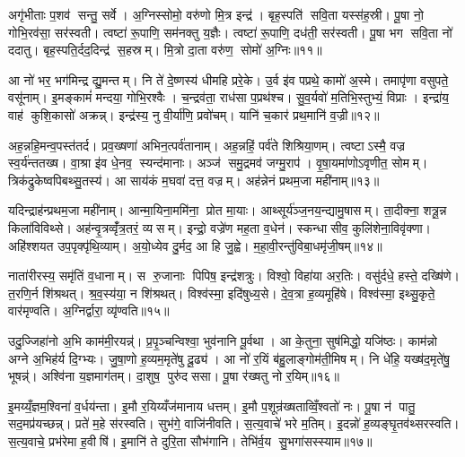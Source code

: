 अगृ॑भीताः प॒शव॑ सन्तु॒ सर्वे। अ॒ग्निस्सोमो॒ वरु॑णो मि॒त्र इन्द्र॑। बृह॒स्पति॑ सवि॒ता यस्स॑ह॒स्री। पू॒षा नो॒ गोभि॒रव॑सा॒ सर॑स्वती। त्वष्टा॑ रू॒पाणि॒ सम॑नक्तु य॒ज्ञैः। त्वष्टा॑ रू॒पाणि॒ दध॑ती॒ सर॑स्वती। पू॒षा भग सवि॒ता नो॑ ददातु। बृह॒स्पति॒र्दद॒दिन्द्र॑ स॒हस्रम्। मि॒त्रो दा॒ता वरु॑ण॒ सोमो॑ अ॒ग्निः॥११॥\anuvakamend[क॒र॒न्निवि॑ष्टमस्यता॒न्नव॑ च]

आ नो॑ भर॒ भग॑मिन्द्र द्यु॒मन्तम्। नि ते॑ दे॒ष्णस्य॑ धीमहि प्ररे॒के। उ॒र्व इ॑व पप्रथे॒ कामो॑ अ॒स्मे। तमापृ॑णा वसुपते॒ वसू॑नाम्। इ॒मङ्कामं॑ मन्दया॒ गोभि॒रश्वैः। च॒न्द्रव॑ता॒ राध॑सा प॒प्रथ॑श्च। सु॒व॒र्यवो॑ म॒तिभि॒स्तुभ्यं॒ विप्राः। इन्द्रा॑य॒ वाह॑ कुशि॒कासो॑ अक्रन्न्। इन्द्र॑स्य॒ नु वी॒र्या॑णि॒ प्रवो॑चम्। यानि॑ च॒कार॑ प्रथ॒मानि॑ व॒ज्री॥१२॥

अह॒न्नहि॒मन्व॒पस्त॑तर्द। प्रव॒ख्षणा॑ अभिन॒त्पर्व॑तानाम्। अह॒न्नहिं॒ पर्व॑ते शिश्रिया॒णम्। त्वष्टाऽस्मै॒ वज्र स्व॒र्य॑न्ततख्ष। वा॒श्रा इ॑व धे॒नव॒ स्यन्द॑मानाः। अञ्ज॑ समु॒द्रमव॑ जग्मु॒राप॑। वृ॒षा॒यमा॑णोऽवृणीत॒ सोमम्। त्रिक॑द्रुकेष्वपिबथ्सु॒तस्य॑। आ साय॑कं म॒घवा॑ दत्त॒ वज्रम्। अह॑न्नेनं प्रथम॒जा मही॑नाम्॥१३॥

यदिन्द्राह॑न्प्रथम॒जा मही॑नाम्। आन्मा॒यिना॒ममि॑ना॒ प्रोत मा॒याः। आथ्सूर्य॑ञ्ज॒नय॒न्द्यामु॒षासम्। ता॒दीक्ना॒ शत्रू॒न्न किला॑विविथ्से। अह॑न्वृ॒त्रव्वृँ॑त्र॒तरं॒ व्यसम्। इन्द्रो॒ वज्रे॑ण मह॒ता व॒धेन॑। स्कन्धासीव॒ कुलि॑शेना॒विवृ॑क्णा। अहि॑श्शयत उप॒पृक्पृ॑थि॒व्याम्। अ॒यो॒ध्येव दु॒र्मद॒ आ हि जु॒ह्वे। म॒हा॒वी॒रन्तु॑विबा॒धमृ॑जी॒षम्॥१४॥

नाता॑रीरस्य॒ समृ॑तिं व॒धानाम्। स रु॒जानाः पिपिष॒ इन्द्र॑शत्रुः। विश्वो॒ विहा॑या अर॒तिः। वसु॑र्दधे॒ हस्ते॒ दख्षि॑णे। त॒रणि॒र्न शि॑श्रथत्। श्र॒व॒स्य॑या॒ न शि॑श्रथत्। विश्व॑स्मा॒ इदि॑षुध्य॒से। दे॒व॒त्रा ह॒व्यमूहि॑षे। विश्व॑स्मा॒ इथ्सु॒कृते॒ वार॑मृण्वति। अ॒ग्निर्द्वारा॒ व्यृ॑ण्वति॥१५॥

उदु॒ज्जिहा॑नो अ॒भि काम॑मी॒रयन्न्॑। प्र॒पृ॒ञ्चन्विश्वा॒ भुव॑नानि पू॒र्वथा। आ के॒तुना॒ सुष॑मिद्धो॒ यजि॑ष्ठः। काम॑न्नो अग्ने अ॒भिह॑र्य दि॒ग्भ्यः। जु॒षा॒णो ह॒व्यम॒मृते॑षु दू॒ढ्य॑। आ नो॑ र॒यिं ब॑हु॒लाङ्गोम॑ती॒मिषम्। नि धे॑हि॒ यख्ष॑द॒मृते॑षु॒ भूषन्न्॑। अश्वि॑ना य॒ज्ञमाग॑तम्। दा॒शुष॒ पुरु॑दससा। पू॒षा र॑ख्षतु नो र॒यिम्॥१६॥

इ॒मय्यँ॒ज्ञम॒श्विना॑ व॒र्धय॑न्ता। इ॒मौ र॒यिय्यँज॑मानाय धत्तम्। इ॒मौ प॒शून्र॑ख्षताव्विँ॒श्वतो॑ नः। पू॒षा न॑ पातु॒ सद॒मप्र॑यच्छन्न्। प्रते॑ म॒हे स॑रस्वति। सुभ॑गे॒ वाजि॑नीवति। स॒त्य॒वाचे॑ भरे म॒तिम्। इ॒दन्नो॑ ह॒व्यङ्घृ॒तव॑थ्सरस्वति। स॒त्य॒वाचे॒ प्रभ॑रेमा ह॒वीषि॑। इ॒मानि॑ ते दुरि॒ता सौभ॑गानि। तेभि॑र्व॒य सु॒भगा॑सस्स्याम॥१७॥\anuvakamend[व॒ज्र्यही॑नामृजी॒षं व्यृ॑ण्वति रख्षतु नो र॒यि सौभ॑गा॒न्येक॑ञ्च]

